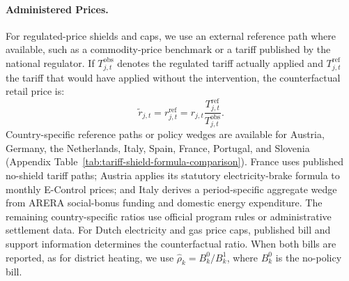 \documentclass[11pt]{article}
\begin{document}
\paragraph{Administered Prices.}
For regulated-price shields and caps, we use an external reference path where available, such as a
commodity-price benchmark or a tariff published by the national regulator. If
$T^{\mathrm{obs}}_{j,t}$ denotes the regulated tariff actually applied and
$T^{\mathrm{ref}}_{j,t}$ the tariff that would have applied without the intervention, the
counterfactual retail price is:
\begin{equation}
\widetilde r_{j,t}
=r^{\mathrm{ref}}_{j,t}
=r_{j,t}\frac{T^{\mathrm{ref}}_{j,t}}{T^{\mathrm{obs}}_{j,t}} .
\end{equation}
Country-specific reference paths or policy wedges are available for Austria, Germany, the Netherlands,
Italy, Spain, France, Portugal, and Slovenia (Appendix
Table~\ref{tab:tariff-shield-formula-comparison}). France uses published no-shield tariff paths;
Austria applies its statutory electricity-brake formula to monthly E-Control prices; and Italy derives
a period-specific aggregate wedge from ARERA social-bonus funding and domestic energy expenditure.
The remaining country-specific ratios use official program rules or administrative settlement data.
For Dutch electricity and gas price caps, published bill and support information determines the
counterfactual ratio. When both bills are reported, as for district heating, we use
$\widehat{\rho}_k=B_k^{0}/B_k^{1}$, where $B_k^{0}$ is the no-policy bill.

\end{document}
